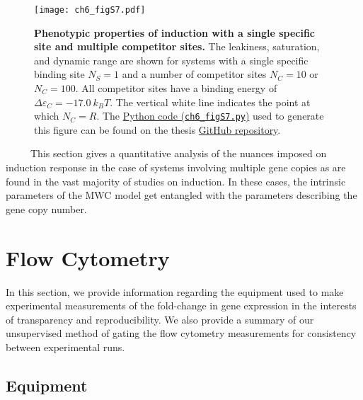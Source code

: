 \documentclass[12pt]{caltech_thesis}
\begin{document}
\hypertarget{fig:fugacity_properties_Nc}{%
\begin{figure}
\centering
\texttt{[image: ch6\_figS7.pdf]}
\caption[{Phenotypic properties of induction with a single specific site
and multiple competitor sites.}]{\textbf{Phenotypic properties of
induction with a single specific site and multiple competitor sites.}
The leakiness, saturation, and dynamic range are shown for systems with
a single specific binding site \(N_S = 1\) and a number of competitor
sites \(N_C = 10\) or \(N_C = 100\). All competitor sites have a binding
energy of \(\Delta \varepsilon_C = -17.0~k_BT\). The vertical white line
indicates the point at which \(N_C = R\). The
\href{https://github.com/gchure/phd/blob/master/src/chapter_06/code/ch6_figS7.py}{Python
code (\texttt{ch6\_figS7.py})} used to generate this figure can be found
on the thesis \href{https://github.com/gchure/phd}{GitHub repository}.}
\label{fig:fugacity_properties_Nc}
\end{figure}
}

~~~~~This section gives a quantitative analysis of the nuances imposed
on induction response in the case of systems involving multiple gene
copies as are found in the vast majority of studies on induction. In
these cases, the intrinsic parameters of the MWC model get entangled
with the parameters describing the gene copy number.

\hypertarget{flow-cytometry-2}{%
\section{Flow Cytometry}\label{flow-cytometry-2}}

In this section, we provide information regarding the equipment used to
make experimental measurements of the fold-change in gene expression in
the interests of transparency and reproducibility. We also provide a
summary of our unsupervised method of gating the flow cytometry
measurements for consistency between experimental runs.

\hypertarget{equipment}{%
\subsection{Equipment}\label{equipment}}
\end{document}
